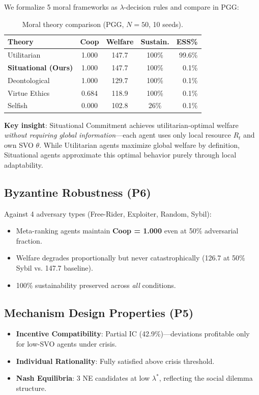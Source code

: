 \documentclass{article}
\begin{document}
We formalize 5 moral frameworks as $\lambda$-decision rules and compare in PGG:

\begin{table}[h]
\centering
\caption{Moral theory comparison (PGG, $N{=}50$, 10 seeds).}
\label{tab:moral}
\begin{tabular}{lcccr}
\toprule
Theory & Coop & Welfare & Sustain. & ESS\% \\
\midrule
Utilitarian & 1.000 & 147.7 & 100\% & 99.6\% \\
\textbf{Situational (Ours)} & 1.000 & 147.7 & 100\% & 0.1\% \\
Deontological & 1.000 & 129.7 & 100\% & 0.1\% \\
Virtue Ethics & 0.684 & 118.9 & 100\% & 0.1\% \\
Selfish & 0.000 & 102.8 & 26\% & 0.1\% \\
\bottomrule
\end{tabular}
\end{table}

\textbf{Key insight}: Situational Commitment achieves utilitarian-optimal welfare \textit{without requiring global information}---each agent uses only local resource $R_t$ and own SVO $\theta$. While Utilitarian agents maximize global welfare by definition, Situational agents approximate this optimal behavior purely through local adaptability.

\subsection{Byzantine Robustness (P6)}

Against 4 adversary types (Free-Rider, Exploiter, Random, Sybil):
\begin{itemize}
    \item Meta-ranking agents maintain \textbf{Coop = 1.000} even at 50\% adversarial fraction.
    \item Welfare degrades proportionally but never catastrophically (126.7 at 50\% Sybil vs. 147.7 baseline).
    \item 100\% sustainability preserved across \textit{all} conditions.
\end{itemize}

\subsection{Mechanism Design Properties (P5)}

\begin{itemize}
    \item \textbf{Incentive Compatibility}: Partial IC (42.9\%)---deviations profitable only for low-SVO agents under crisis.
    \item \textbf{Individual Rationality}: Fully satisfied above crisis threshold.
    \item \textbf{Nash Equilibria}: 3 NE candidates at low $\lambda^*$, reflecting the social dilemma structure.
\end{itemize}
\end{document}
